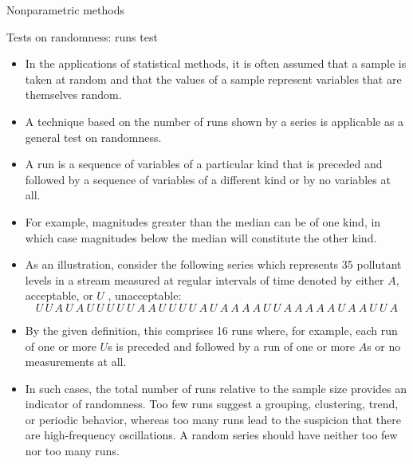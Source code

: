 \documentclass[8pt]{beamer}
\renewcommand{\emph}[1]{\textcolor{myorange}{#1}}
\begin{document}
\begin{frame}{Nonparametric methods}
    \begin{block}{Tests on randomness: runs test}
    \end{block}
    \begin{itemize}
        \item In the applications of statistical methods, it is often assumed that a sample is taken at random and that the values of a sample represent variables that are themselves random.
        \item A technique based on the \emph{number of runs } shown by a series is applicable as a general test on randomness.
        \item A \alert{run} is a sequence of variables of a particular kind that is preceded and followed by a sequence of variables of a different kind or by no variables at all.
        \item For example, \emph{magnitudes greater} than the \emph{median} can be of one kind, in which case \emph{magnitudes below} the \emph{median} will constitute the other kind.
        \item As an illustration, consider the following series which represents 35 pollutant levels in a stream measured at regular intervals of time denoted by either $A$, \emph{acceptable}, or $U$ , \emph{unacceptable}:
            \[
U \, U  \, A  \ U  \ A  \ U  \ U  \ U  \ U  \ U  \ A  \ A  \ U  \ U  \ U  \ U  \ A  \ U  \ A  \ A  \ A  \ A  \ U  \ U  \ A  \ A  \ A  \ A  \ A  \ U  \ A  \ A  \ U  \ U  \ A 
\]
\item By the given definition, this comprises 16 runs where, for example, each run of one or more $U$s is preceded and followed by a run of one or more $A$s or no measurements at all.
\item In such cases, the total number of \emph{runs} relative to the \emph{sample size} provides an indicator of \emph{randomness}. Too few runs suggest a \emph{grouping}, \emph{clustering}, \emph{trend}, or \emph{periodic} behavior, whereas too many runs lead to the suspicion that there are \emph{high-frequency oscillations}. A random series should have neither too few nor too many runs.
    \end{itemize}

    \end{frame}
\end{document}
